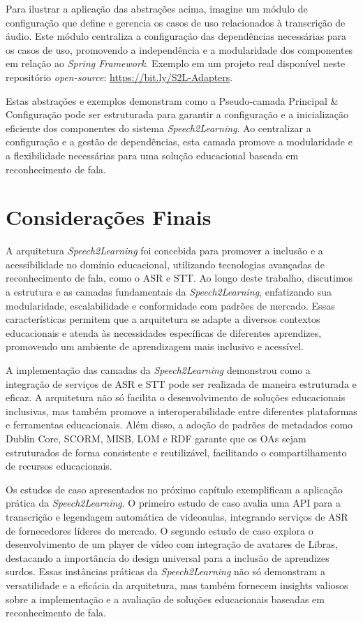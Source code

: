 Para ilustrar a aplicação das abstrações acima, imagine um módulo de configuração que define e gerencia os casos de uso relacionados à transcrição de áudio. Este módulo centraliza a configuração das dependências necessárias para os casos de uso, promovendo a independência e a modularidade dos componentes em relação ao \textit{Spring Framework}. Exemplo em um projeto real disponível neste repositório \textit{open-source}: \url{https://bit.ly/S2L-Adapters}.

Estas abstrações e exemplos demonstram como a Pseudo-camada Principal \& Configuração pode ser estruturada para garantir a configuração e a inicialização eficiente dos componentes do sistema \textit{Speech2Learning}. Ao centralizar a configuração e a gestão de dependências, esta camada promove a modularidade e a flexibilidade necessárias para uma solução educacional baseada em reconhecimento de fala.

\section{Considerações Finais}

A arquitetura \textit{Speech2Learning} foi concebida para promover a inclusão e a acessibilidade no domínio educacional, utilizando tecnologias avançadas de reconhecimento de fala, como o ASR e STT. Ao longo deste trabalho, discutimos a estrutura e as camadas fundamentais da \textit{Speech2Learning}, enfatizando sua modularidade, escalabilidade e conformidade com padrões de mercado. Essas características permitem que a arquitetura se adapte a diversos contextos educacionais e atenda às necessidades específicas de diferentes aprendizes, promovendo um ambiente de aprendizagem mais inclusivo e acessível.

A implementação das camadas da \textit{Speech2Learning} demonstrou como a integração de serviços de ASR e STT pode ser realizada de maneira estruturada e eficaz. A arquitetura não só facilita o desenvolvimento de soluções educacionais inclusivas, mas também promove a interoperabilidade entre diferentes plataformas e ferramentas educacionais. Além disso, a adoção de padrões de metadados como Dublin Core, SCORM, MISB, LOM e RDF garante que os OAs sejam estruturados de forma consistente e reutilizável, facilitando o compartilhamento de recursos educacionais.

Os estudos de caso apresentados no próximo capítulo exemplificam a aplicação prática da \textit{Speech2Learning}. O primeiro estudo de caso avalia uma API para a transcrição e legendagem automática de videoaulas, integrando serviços de ASR de fornecedores líderes do mercado. O segundo estudo de caso explora o desenvolvimento de um player de vídeo com integração de avatares de Libras, destacando a importância do design universal para a inclusão de aprendizes surdos. Essas instâncias práticas da \textit{Speech2Learning} não só demonstram a versatilidade e a eficácia da arquitetura, mas também fornecem insights valiosos sobre a implementação e a avaliação de soluções educacionais baseadas em reconhecimento de fala.